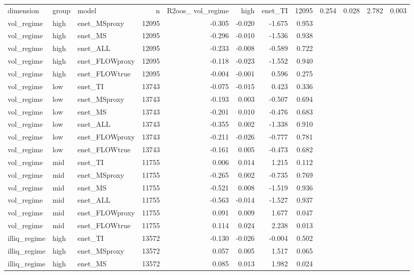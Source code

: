 \begin{tabular}{lllrrrrr}
\toprule
dimension & group & model & n & R2oos_%
\midrule
vol_regime & high & enet_TI & 12095 & 0.254 & 0.028 & 2.782 & 0.003 \\
vol_regime & high & enet_MSproxy & 12095 & -0.305 & -0.020 & -1.675 & 0.953 \\
vol_regime & high & enet_MS & 12095 & -0.296 & -0.010 & -1.536 & 0.938 \\
vol_regime & high & enet_ALL & 12095 & -0.233 & -0.008 & -0.589 & 0.722 \\
vol_regime & high & enet_FLOWproxy & 12095 & -0.118 & -0.023 & -1.552 & 0.940 \\
vol_regime & high & enet_FLOWtrue & 12095 & -0.004 & -0.001 & 0.596 & 0.275 \\
vol_regime & low & enet_TI & 13743 & -0.075 & -0.015 & 0.423 & 0.336 \\
vol_regime & low & enet_MSproxy & 13743 & -0.193 & 0.003 & -0.507 & 0.694 \\
vol_regime & low & enet_MS & 13743 & -0.201 & 0.010 & -0.476 & 0.683 \\
vol_regime & low & enet_ALL & 13743 & -0.355 & 0.002 & -1.338 & 0.910 \\
vol_regime & low & enet_FLOWproxy & 13743 & -0.211 & -0.026 & -0.777 & 0.781 \\
vol_regime & low & enet_FLOWtrue & 13743 & -0.161 & 0.005 & -0.473 & 0.682 \\
vol_regime & mid & enet_TI & 11755 & 0.006 & 0.014 & 1.215 & 0.112 \\
vol_regime & mid & enet_MSproxy & 11755 & -0.265 & 0.002 & -0.735 & 0.769 \\
vol_regime & mid & enet_MS & 11755 & -0.521 & 0.008 & -1.519 & 0.936 \\
vol_regime & mid & enet_ALL & 11755 & -0.563 & -0.014 & -1.527 & 0.937 \\
vol_regime & mid & enet_FLOWproxy & 11755 & 0.091 & 0.009 & 1.677 & 0.047 \\
vol_regime & mid & enet_FLOWtrue & 11755 & 0.114 & 0.024 & 2.238 & 0.013 \\
illiq_regime & high & enet_TI & 13572 & -0.130 & -0.026 & -0.004 & 0.502 \\
illiq_regime & high & enet_MSproxy & 13572 & 0.057 & 0.005 & 1.517 & 0.065 \\
illiq_regime & high & enet_MS & 13572 & 0.085 & 0.013 & 1.982 & 0.024 \\

\end{tabular}
